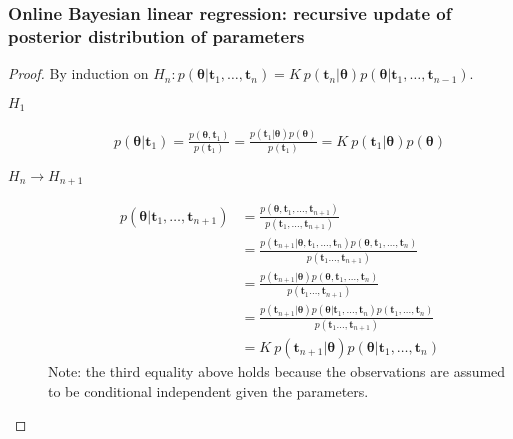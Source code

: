 \documentclass[11pt]{beamer}
\begin{document}
\begin{frame}
    \frametitle{Online Bayesian linear regression: recursive update of posterior distribution of parameters}
	\tiny
	\begin{proof}
		By induction on $H_n: p(\boldsymbol{\theta}|\mathbf{t}_1,\ldots,\mathbf{t}_n)=K\ p(\mathbf{t}_n|\boldsymbol{\theta})p(\boldsymbol{\theta}|\mathbf{t}_1,\ldots,\mathbf{t}_{n-1})$.
		\begin{description}
			\item[$H_1$]
				\begin{align*}
					p(\boldsymbol{\theta}|\mathbf{t}_1)=\frac{p(\boldsymbol{\theta},\mathbf{t}_1)}{p(\mathbf{t}_1)}=\frac{p(\mathbf{t}_1|\boldsymbol{\theta})p(\boldsymbol{\theta})}{p(\mathbf{t}_1)}=K\ p(\mathbf{t}_1|\boldsymbol{\theta})p(\boldsymbol{\theta})
				\end{align*}
			\item[$H_n\rightarrow H_{n+1}$]
				\begin{align*}
					p(\boldsymbol{\theta}|\mathbf{t}_1,\ldots,\mathbf{t}_{n+1})&=\frac{p(\boldsymbol{\theta},\mathbf{t}_1,\ldots,\mathbf{t}_{n+1})}{p(\mathbf{t}_1,\ldots,\mathbf{t}_{n+1})}\\
                                                                               &=\frac{p(\mathbf{t}_{n+1}|\boldsymbol{\theta},\mathbf{t}_1,\ldots,\mathbf{t}_n)p(\boldsymbol{\theta},\mathbf{t}_1,\ldots,\mathbf{t}_n)}{p(\mathbf{t}_1\ldots,\mathbf{t}_{n+1})}\\
                                                                               &=\frac{p(\mathbf{t}_{n+1}|\boldsymbol{\theta})p(\boldsymbol{\theta},\mathbf{t}_1,\ldots,\mathbf{t}_n)}{p(\mathbf{t}_1\ldots,\mathbf{t}_{n+1})}\\
                                                                               &=\frac{p(\mathbf{t}_{n+1}|\boldsymbol{\theta})p(\boldsymbol{\theta}|\mathbf{t}_1,\ldots,\mathbf{t}_n)p(\mathbf{t}_1,\ldots,\mathbf{t}_n)}{p(\mathbf{t}_1\ldots,\mathbf{t}_{n+1})}\\
                                                                               &=K\ p(\mathbf{t}_{n+1}|\boldsymbol{\theta})p(\boldsymbol{\theta}|\mathbf{t}_1,\ldots,\mathbf{t}_n)
				\end{align*}
				Note: the third equality above holds because the observations are assumed to be conditional independent given the parameters.
		\end{description}
	\end{proof}
	\normalsize
\end{frame}
\end{document}
